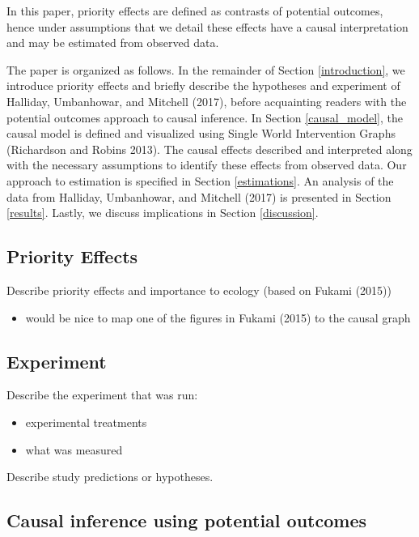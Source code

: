 \documentclass[]{article}
\providecommand{\tightlist}{%
  \setlength{\itemsep}{0pt}\setlength{\parskip}{0pt}}
\begin{document}
In this paper, priority effects are defined as contrasts of potential
outcomes, hence under assumptions that we detail these effects have a
causal interpretation and may be estimated from observed data.

The paper is organized as follows. In the remainder of Section
\ref{introduction}, we introduce priority effects and briefly describe
the hypotheses and experiment of Halliday, Umbanhowar, and Mitchell
(2017), before acquainting readers with the potential outcomes approach
to causal inference. In Section \ref{causal_model}, the causal model is
defined and visualized using Single World Intervention Graphs
(Richardson and Robins 2013). The causal effects described and
interpreted along with the necessary assumptions to identify these
effects from observed data. Our approach to estimation is specified in
Section \ref{estimations}. An analysis of the data from Halliday,
Umbanhowar, and Mitchell (2017) is presented in Section \ref{results}.
Lastly, we discuss implications in Section \ref{discussion}.

\subsection{Priority Effects}\label{priority-effects}

Describe priority effects and importance to ecology (based on Fukami
(2015))

\begin{itemize}
\tightlist
\item
  would be nice to map one of the figures in Fukami (2015) to the causal
  graph
\end{itemize}

\subsection{Experiment}\label{experiment}

Describe the experiment that was run:

\begin{itemize}
\tightlist
\item
  experimental treatments
\item
  what was measured
\end{itemize}

Describe study predictions or hypotheses.

\subsection{Causal inference using potential
outcomes}\label{causal-inference-using-potential-outcomes}
\end{document}
